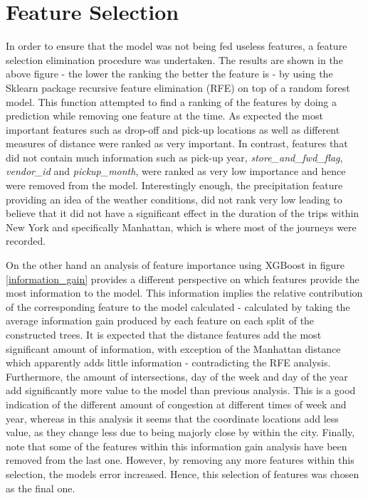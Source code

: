 \documentclass[a4paper]{article}
\begin{document}
\section{Feature Selection}
In order to ensure that the model was not being fed useless features, a feature
selection elimination procedure was undertaken. The results are shown in the
above figure - the lower the ranking the better the feature is - by using the
Sklearn package recursive feature elimination (RFE) on top of a random forest
model. This function attempted to find a ranking of the features by doing a
prediction while removing one feature at the time. As expected the most
important features such as drop-off and pick-up locations as well as different
measures of distance were ranked as very important. In contrast, features that
did not contain much information such as pick-up year,
\textit{store\_and\_fwd\_flag}, \textit{vendor\_id} and \textit{pickup\_month},
were ranked as very low importance and hence were removed from the model.
Interestingly enough, the precipitation feature providing an idea of the weather
conditions, did not rank very low leading to believe that it did not have a
significant effect in the duration of the trips within New York and specifically
Manhattan, which is where most of the journeys were recorded.

On the other hand an analysis of feature importance using XGBoost in figure
\ref{information_gain} provides a different perspective on which features
provide the most information to the model. This information implies the relative
contribution of the corresponding feature to the model calculated - calculated
by taking the average information gain produced by each feature on each split of
the constructed trees. It is expected that the distance features add the most
significant amount of information, with exception of the Manhattan distance which
apparently adds little information - contradicting the RFE analysis.
Furthermore, the amount of intersections, day of the week and day of the year
add significantly more value to the model than previous analysis. This is a good
indication of the different amount of congestion at different times of week and
year, whereas in this analysis it seems that the coordinate locations add less
value, as they change less due to being majorly close by within the city.
Finally, note that some of the features within this information gain analysis
have been removed from the last one. However, by removing any more features
within this selection, the models error increased. Hence, this selection of
features was chosen as the final one.
\end{document}
